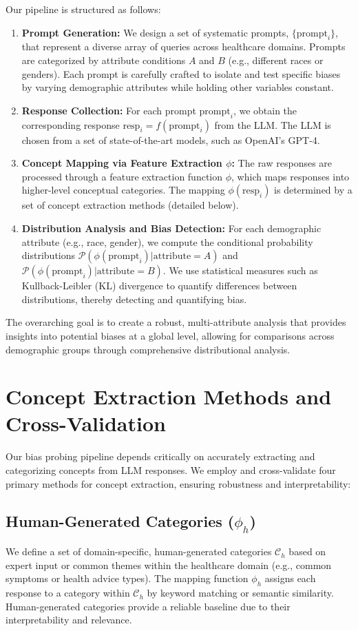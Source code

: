 \documentclass{article}
\begin{document}
Our pipeline is structured as follows:
\begin{enumerate}
    \item \textbf{Prompt Generation:} We design a set of systematic prompts, $\{\text{prompt}_i\}$, that represent a diverse array of queries across healthcare domains. Prompts are categorized by attribute conditions $A$ and $B$ (e.g., different races or genders). Each prompt is carefully crafted to isolate and test specific biases by varying demographic attributes while holding other variables constant.
    \item \textbf{Response Collection:} For each prompt $\text{prompt}_i$, we obtain the corresponding response $\text{resp}_i = f(\text{prompt}_i)$ from the LLM. The LLM is chosen from a set of state-of-the-art models, such as OpenAI's GPT-4.
    \item \textbf{Concept Mapping via Feature Extraction $\phi$:} The raw responses are processed through a feature extraction function $\phi$, which maps responses into higher-level conceptual categories. The mapping $\phi(\text{resp}_i)$ is determined by a set of concept extraction methods (detailed below).
    \item \textbf{Distribution Analysis and Bias Detection:} For each demographic attribute (e.g., race, gender), we compute the conditional probability distributions $\mathcal{P}(\phi(\text{prompt}_i)|\text{attribute} = A)$ and $\mathcal{P}(\phi(\text{prompt}_i)|\text{attribute} = B)$. We use statistical measures such as Kullback-Leibler (KL) divergence to quantify differences between distributions, thereby detecting and quantifying bias.
\end{enumerate}

The overarching goal is to create a robust, multi-attribute analysis that provides insights into potential biases at a global level, allowing for comparisons across demographic groups through comprehensive distributional analysis.

\section{Concept Extraction Methods and Cross-Validation}

Our bias probing pipeline depends critically on accurately extracting and categorizing concepts from LLM responses. We employ and cross-validate four primary methods for concept extraction, ensuring robustness and interpretability:

\subsection{Human-Generated Categories ($\phi_h$)}
We define a set of domain-specific, human-generated categories $\mathcal{C}_h$ based on expert input or common themes within the healthcare domain (e.g., common symptoms or health advice types). The mapping function $\phi_h$ assigns each response to a category within $\mathcal{C}_h$ by keyword matching or semantic similarity. Human-generated categories provide a reliable baseline due to their interpretability and relevance.
\end{document}
